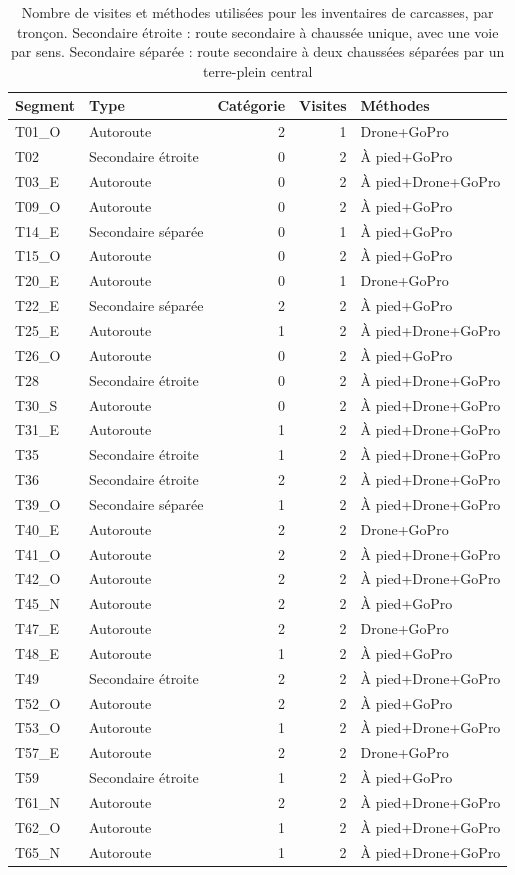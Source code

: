 \begin{table}[H]
\centering
\small
\caption{Nombre de visites et méthodes utilisées pour les inventaires de carcasses, par tronçon. Secondaire étroite : route secondaire à chaussée unique, avec une voie par sens. Secondaire séparée : route secondaire à deux chaussées séparées par un terre-plein central}
\label{tab:visites}
\begin{tabular}{llrrl}
\toprule
Segment & Type & Catégorie & Visites & Méthodes \\
\midrule
T01\_O & Autoroute & 2 & 1 & Drone+GoPro \\
T02 & Secondaire étroite & 0 & 2 & À pied+GoPro \\
T03\_E & Autoroute & 0 & 2 & À pied+Drone+GoPro \\
T09\_O & Autoroute & 0 & 2 & À pied+GoPro \\
T14\_E & Secondaire séparée & 0 & 1 & À pied+GoPro \\
T15\_O & Autoroute & 0 & 2 & À pied+GoPro \\
T20\_E & Autoroute & 0 & 1 & Drone+GoPro \\
T22\_E & Secondaire séparée & 2 & 2 & À pied+GoPro \\
T25\_E & Autoroute & 1 & 2 & À pied+Drone+GoPro \\
T26\_O & Autoroute & 0 & 2 & À pied+GoPro \\
T28 & Secondaire étroite & 0 & 2 & À pied+Drone+GoPro \\
T30\_S & Autoroute & 0 & 2 & À pied+Drone+GoPro \\
T31\_E & Autoroute & 1 & 2 & À pied+Drone+GoPro \\
T35 & Secondaire étroite & 1 & 2 & À pied+Drone+GoPro \\
T36 & Secondaire étroite & 2 & 2 & À pied+Drone+GoPro \\
T39\_O & Secondaire séparée & 1 & 2 & À pied+Drone+GoPro \\
T40\_E & Autoroute & 2 & 2 & Drone+GoPro \\
T41\_O & Autoroute & 2 & 2 & À pied+Drone+GoPro \\
T42\_O & Autoroute & 2 & 2 & À pied+Drone+GoPro \\
T45\_N & Autoroute & 2 & 2 & À pied+GoPro \\
T47\_E & Autoroute & 2 & 2 & Drone+GoPro \\
T48\_E & Autoroute & 1 & 2 & À pied+GoPro \\
T49 & Secondaire étroite & 2 & 2 & À pied+Drone+GoPro \\
T52\_O & Autoroute & 2 & 2 & À pied+GoPro \\
T53\_O & Autoroute & 1 & 2 & À pied+Drone+GoPro \\
T57\_E & Autoroute & 2 & 2 & Drone+GoPro \\
T59 & Secondaire étroite & 1 & 2 & À pied+GoPro \\
T61\_N & Autoroute & 2 & 2 & À pied+Drone+GoPro \\
T62\_O & Autoroute & 1 & 2 & À pied+Drone+GoPro \\
T65\_N & Autoroute & 1 & 2 & À pied+Drone+GoPro \\
\bottomrule
\end{tabular}
\end{table}

